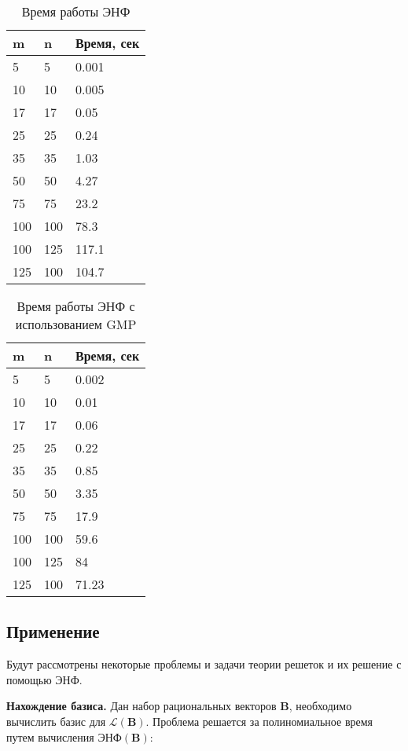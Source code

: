 \begin{table}[H]
  \caption{Время работы ЭНФ}
  \centering
  \begin{tabular}{ | l | l | l |}
  \hline
  m & n & Время, сек   \\ \hline
  5 & 5 & 0.001 \\ \hline
  10 & 10 & 0.005 \\ \hline
  17 & 17 & 0.05 \\ \hline
  25 & 25 & 0.24 \\ \hline
  35 & 35 & 1.03 \\ \hline
  50 & 50 & 4.27 \\ \hline
  75 & 75 & 23.2 \\ \hline
  100 & 100 & 78.3 \\ \hline
  100 & 125 & 117.1 \\ \hline
  125 & 100 & 104.7 \\ \hline
  \end{tabular}
  \label{table:HNF}
\end{table}

\begin{table}[H]
  \caption{Время работы ЭНФ с использованием GMP}
  \centering
  \begin{tabular}{ | l | l | l |}
  \hline
  m & n & Время, сек   \\ \hline
  5 & 5 & 0.002 \\ \hline
  10 & 10 & 0.01 \\ \hline
  17 & 17 & 0.06 \\ \hline
  25 & 25 & 0.22 \\ \hline
  35 & 35 & 0.85 \\ \hline
  50 & 50 & 3.35 \\ \hline
  75 & 75 & 17.9 \\ \hline
  100 & 100 & 59.6 \\ \hline
  100 & 125 & 84 \\ \hline
  125 & 100 & 71.23 \\ \hline
  \end{tabular}
  \label{table:HNF_GMP}
\end{table}

\subsection{Применение}

Будут рассмотрены некоторые проблемы и задачи теории решеток и их решение с помощью ЭНФ.

\textbf{Нахождение базиса.} Дан набор рациональных векторов $ \mathbf{B} $, необходимо вычислить базис для $ \mathcal{L}(\mathbf{B}) $. Проблема решается за полиномиальное время путем вычисления $ \text{ЭНФ}(\mathbf{B}) $: 

